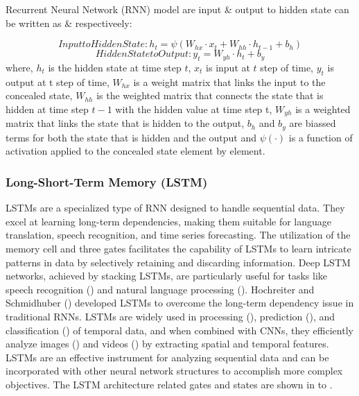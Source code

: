 \documentclass[a4paper, fleqn]{cas-sc}
\theoremstyle{definition}
\theoremstyle{remark}
\begin{document}
Recurrent Neural Network (RNN) model are input \& output to hidden state can be written as  \&  respectiveely: 

  \begin{equation} \label{equ: ih rnn}
    Input to Hidden State:  h_t= \psi (W_{hx} \cdot x_t + W_{hh} \cdot h_{t-1} +b_h)
  \end{equation}
  \begin{equation} \label{equ: h rnn}
    Hidden State to Output:  y_t=W_{yh}\cdot h_t+b_y
  \end{equation}
where,  $h_t $ is the hidden state at time step $t$,  $x_t$ is input at $t$ step of time,  $y_t$ is output at t step of time,  $W_{hx} $ is a weight matrix that links the input to the concealed state,  $W_{hh}$ is the weighted matrix that connects the state that is hidden at time step $t-1$ with the hidden value at time step t,  $W_{yh}$ is a weighted matrix that links the state that is hidden to the output,  $b_h$ and $b_y$ are biassed terms for both the state that is hidden and the output and $\psi (\cdot)$ is a function of activation applied to the concealed state element by element.


\subsubsection{Long-Short-Term Memory (LSTM)}
LSTMs are a specialized type of RNN designed to handle sequential data. They excel at learning long-term dependencies,  making them suitable for language translation,  speech recognition,  and time series forecasting. The utilization of the memory cell and three gates facilitates the capability of LSTMs to learn intricate patterns in data by selectively retaining and discarding information. Deep LSTM networks,  achieved by stacking LSTMs,  are particularly useful for tasks like speech recognition (\cite{soltau2016neural, jo2020approximate}) and natural language processing (\cite{wang2015learning, nammous2019natural}). Hochreiter and Schmidhuber  (\cite{hochreiter1997long}) developed LSTMs to overcome the long-term dependency issue in traditional RNNs. LSTMs are widely used in processing (\cite{sahin2018nonuniformly}),  prediction (\cite{gers2000learning}),  and classification (\cite{zhou2015c, karim2017lstm}) of temporal data,  and when combined with CNNs,  they efficiently analyze images (\cite{li2019cnn, rajendran2020land, islam2020combined}) and videos (\cite{ullah2017action, li2020classifying, gao2017video, bin2018describing}) by extracting spatial and temporal features. LSTMs are an effective instrument for analyzing sequential data and can be incorporated with other neural network structures to accomplish more complex objectives.
The LSTM architecture related gates and states are shown in  to .
\end{document}
